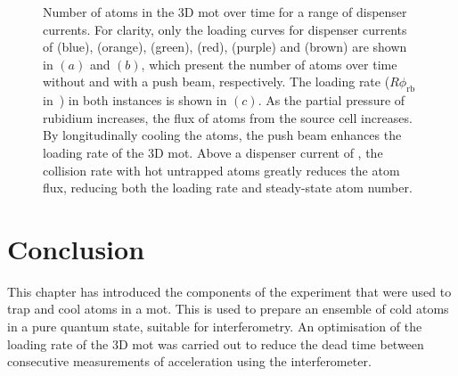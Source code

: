 \begin{figure}[!htbp]
	\caption[3D \ac{mot} atom number vs dispenser current with and without a
		push beam.]{Number of atoms in the 3D \ac{mot} over time for a range of
		dispenser currents. For clarity, only the loading curves for dispenser
		currents of
		 (blue),
		(orange),  (green),  (red),
		 (purple) and  (brown) are
		shown in \((a)\) and \((b)\), which present the number of atoms over
		time without and with a push beam, respectively. The loading rate (\(R
		\phi_\text{rb}\) in~) in both instances is
		shown in \((c)\). As the partial pressure of rubidium increases, the
		flux of atoms from the source cell increases. By longitudinally cooling
		the atoms, the push beam enhances the loading rate of the 3D \ac{mot}.
		Above a dispenser current of
		, the collision rate with hot untrapped atoms greatly reduces the atom flux, reducing both the loading rate and steady-state atom number.}
	\label{fig:loading_plots}
\end{figure}

\section{Conclusion}
This chapter has introduced the components of the experiment that were used to
trap and cool atoms in a \ac{mot}. This is used to prepare an ensemble of cold
atoms in a pure quantum state, suitable for interferometry. An optimisation of
the loading rate of the 3D \ac{mot} was carried out to reduce the dead time
between consecutive measurements of acceleration using the interferometer.
